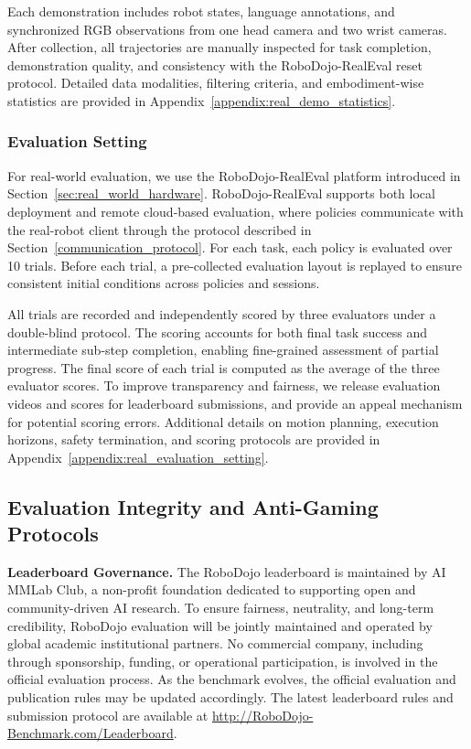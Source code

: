 Each demonstration includes robot states, language annotations, and synchronized RGB observations from one head camera and two wrist cameras. After collection, all trajectories are manually inspected for task completion, demonstration quality, and consistency with the RoboDojo-RealEval reset protocol. Detailed data modalities, filtering criteria, and embodiment-wise statistics are provided in Appendix~\ref{appendix:real_demo_statistics}.

\subsubsection{Evaluation Setting}

For real-world evaluation, we use the RoboDojo-RealEval platform introduced in Section~\ref{sec:real_world_hardware}. RoboDojo-RealEval supports both local deployment and remote cloud-based evaluation, where policies communicate with the real-robot client through the protocol described in Section~\ref{communication_protocol}. For each task, each policy is evaluated over 10 trials. Before each trial, a pre-collected evaluation layout is replayed to ensure consistent initial conditions across policies and sessions.

All trials are recorded and independently scored by three evaluators under a double-blind protocol. The scoring accounts for both final task success and intermediate sub-step completion, enabling fine-grained assessment of partial progress. The final score of each trial is computed as the average of the three evaluator scores. To improve transparency and fairness, we release evaluation videos and scores for leaderboard submissions, and provide an appeal mechanism for potential scoring errors. Additional details on motion planning, execution horizons, safety termination, and scoring protocols are provided in Appendix~\ref{appendix:real_evaluation_setting}.


\subsection{Evaluation Integrity and Anti-Gaming Protocols}

\begin{tcolorbox}[
colback=Blue_1!6,
colframe=Blue_1!65,
boxrule=0.6pt,
arc=2pt,
left=6pt,
right=6pt,
top=5pt,
bottom=5pt
]
\small
\textbf{\textcolor{Blue_1}{Leaderboard Governance.}}
The RoboDojo leaderboard is maintained by AI MMLab Club, a non-profit foundation dedicated to supporting open and community-driven AI research.
To ensure fairness, neutrality, and long-term credibility, RoboDojo evaluation will be jointly maintained and operated by global academic institutional partners.
No commercial company, including through sponsorship, funding, or operational participation, is involved in the official evaluation process.
As the benchmark evolves, the official evaluation and publication rules may be updated accordingly.
The latest leaderboard rules and submission protocol are available at
\href{http://RoboDojo-Benchmark.com/leaderboard}{http://RoboDojo-Benchmark.com/Leaderboard}.
\end{tcolorbox}

